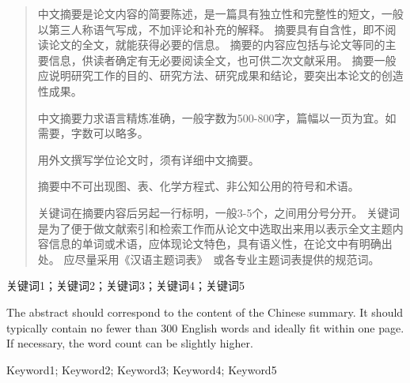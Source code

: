 \begin{abstract}
    中文摘要是论文内容的简要陈述，是一篇具有独立性和完整性的短文，一般以第三人称语气写成，不加评论和补充的解释。
    摘要具有自含性，即不阅读论文的全文，就能获得必要的信息。
    摘要的内容应包括与论文等同的主要信息，供读者确定有无必要阅读全文，也可供二次文献采用。
    摘要一般应说明研究工作的目的、研究方法、研究成果和结论，要突出本论文的创造性成果。

    中文摘要力求语言精炼准确，一般字数为500-800字，篇幅以一页为宜。如需要，字数可以略多。

    用外文撰写学位论文时，须有详细中文摘要。

    摘要中不可出现图、表、化学方程式、非公知公用的符号和术语。

    关键词在摘要内容后另起一行标明，一般3-5个，之间用分号分开。
    关键词是为了便于做文献索引和检索工作而从论文中选取出来用以表示全文主题内容信息的单词或术语，应体现论文特色，具有语义性，在论文中有明确出处。
    应尽量采用《汉语主题词表》~\cite{REF00000003}或各专业主题词表提供的规范词。
\end{abstract}

\begin{keywords}
    关键词1；关键词2；关键词3；关键词4；关键词5
\end{keywords}

\begin{enabstract}
    The abstract should correspond to the content of the Chinese summary.
    It should typically contain no fewer than 300 English words and ideally fit within one page.
    If necessary, the word count can be slightly higher.
\end{enabstract}

\begin{enkeywords}
    Keyword1; Keyword2; Keyword3; Keyword4; Keyword5
\end{enkeywords}
